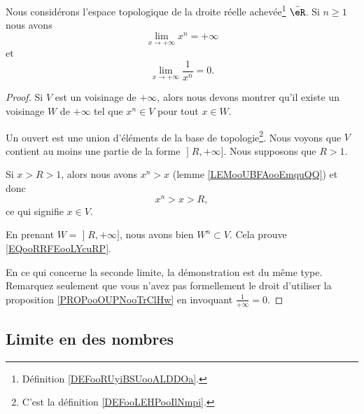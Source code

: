 \begin{lemma}       \label{LEMooFCIXooJuHFqk}
	Nous considérons l'espace topologique de la droite réelle achevée\footnote{Définition \ref{DEFooRUyiBSUooALDDOa}.} \( \bar \eR\). Si \( n\geq 1\) nous avons
	\begin{equation}        \label{EQooRRFEooLYcuRP}
		\lim_{x\to +\infty} x^n = +\infty
	\end{equation}
	et
	\begin{equation}
		\lim_{x\to +\infty} \frac{1}{ x^n }=0.
	\end{equation}
\end{lemma}

\begin{proof}
	Si \( V\) est un voisinage de \( +\infty\), alors nous devons montrer qu'il existe un voisinage \( W\) de \( +\infty\) tel que \( x^n\in V\) pour tout \( x\in W\).

	Un ouvert est une union d'éléments de la base de topologie\footnote{C'est la définition \ref{DEFooLEHPooIlNmpi}.}. Nous voyons que \( V\) contient au moins une partie de la forme \( \mathopen] R , +\infty \mathclose]\). Nous supposons que \( R>1\).

	Si \( x>R>1\), alors nous avons \( x^n>x\) (lemme \ref{LEMooUBFAooEmquQQ}) et donc
	\begin{equation}
		x^n> x>R,
	\end{equation}
	ce qui signifie \( x\in V\).

	En prenant \( W=\mathopen] R , +\infty \mathclose]\), nous avons bien \( W^n\subset V\). Cela prouve \eqref{EQooRRFEooLYcuRP}.

	En ce qui concerne la seconde limite, la démonstration est du même type. Remarquez seulement que vous n'avez pas formellement le droit d'utiliser la proposition \ref{PROPooOUPNooTrClHw} en invoquant \( \frac{1}{ +\infty }=0\).
\end{proof}

\subsection{Limite en des nombres}

